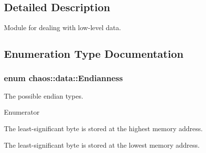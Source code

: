 \subsection{Detailed Description}
Module for dealing with low-\/level data. 

\subsection{Enumeration Type Documentation}
\hypertarget{namespacechaos_1_1data_adb2657d50c0b84cdc1153001031bbf3f}{
\subsubsection[{Endianness}]{\setlength{\rightskip}{0pt plus 5cm}enum {\bf chaos\-::data\-::\-Endianness}}}\label{namespacechaos_1_1data_adb2657d50c0b84cdc1153001031bbf3f}


The possible endian types. 

\begin{Desc}
\item[Enumerator]\par
\begin{description}
\item[{\em 
\hypertarget{namespacechaos_1_1data_adb2657d50c0b84cdc1153001031bbf3fa0e1ed99b965cedefe24534be309738ad}{E\-N\-D\-I\-A\-N\-\_\-\-B\-I\-G}\label{namespacechaos_1_1data_adb2657d50c0b84cdc1153001031bbf3fa0e1ed99b965cedefe24534be309738ad}
}]The least-\/significant byte is stored at the highest memory address. \item[{\em 
\hypertarget{namespacechaos_1_1data_adb2657d50c0b84cdc1153001031bbf3fa7fc5455bb6147c278dfa4a84e255c66d}{E\-N\-D\-I\-A\-N\-\_\-\-L\-I\-T\-T\-L\-E}\label{namespacechaos_1_1data_adb2657d50c0b84cdc1153001031bbf3fa7fc5455bb6147c278dfa4a84e255c66d}
}]The least-\/significant byte is stored at the lowest memory address. \end{description}
\end{Desc}


